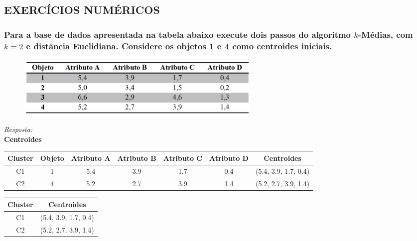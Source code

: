 \documentclass{article}
\begin{document}
  \subsection{EXERCÍCIOS NUMÉRICOS}

  \subsubsection{Para a base de dados apresentada na tabela abaixo execute dois passos do algoritmo $k$-Médias, com $k = 2$ e distância Euclidiana. Considere os objetos 1 e 4 como centroides iniciais.}
  \begin{figure}[H]
      \centering 
      \includegraphics[width=12cm]{tab-4-2-1.png} 
    \end{figure}

  \textit{Resposta:} \\
  \textbf{Centroides}

  \begin{table}[H]
    \centering
    \begin{tabular}{|c|c|c|c|c|c|c|}
    \hline
    \rowcolor[HTML]{EFEFEF} 
    \textbf{Cluster} & \textbf{Objeto} & \textbf{Atributo A} & \textbf{Atributo B} & \textbf{Atributo C} & \textbf{Atributo D} & \textbf{Centroides}  \\ \hline
    C1               & 1               & 5.4                 & 3.9                 & 1.7                 & 0.4                 & (5.4, 3.9, 1.7, 0.4) \\ \hline
    C2               & 4               & 5.2                 & 2.7                 & 3.9                 & 1.4                 & (5.2, 2.7, 3.9, 1.4) \\ \hline
    \end{tabular}
  \end{table}

  \begin{table}[H]
    \centering
    \begin{tabular}{|c|c|}
    \hline
    \rowcolor[HTML]{EFEFEF} 
    \textbf{Cluster} & \textbf{Centroides}  \\ \hline
    C1               & (5.4, 3.9, 1.7, 0.4) \\ \hline
    C2               & (5.2, 2.7, 3.9, 1.4) \\ \hline
    \end{tabular}
  \end{table}
\end{document}
